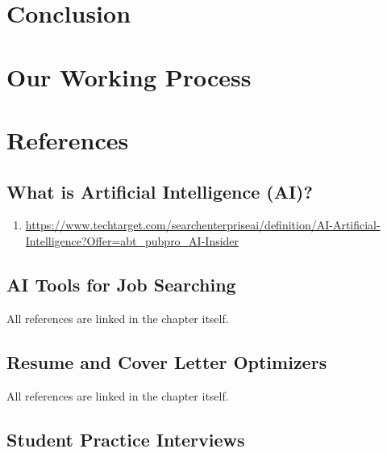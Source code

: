 \documentclass[
]{book}
\providecommand{\tightlist}{%
  \setlength{\itemsep}{0pt}\setlength{\parskip}{0pt}}
\begin{document}
\hypertarget{conclusion}{%
\chapter{Conclusion}\label{conclusion}}

\hypertarget{our-working-process}{%
\chapter{Our Working Process}\label{our-working-process}}

\hypertarget{references}{%
\chapter{References}\label{references}}

\hypertarget{what-is-artificial-intelligence-ai-1}{%
\section{What is Artificial Intelligence (AI)?}\label{what-is-artificial-intelligence-ai-1}}

\begin{enumerate}
\def\labelenumi{(\arabic{enumi})}
\tightlist
\item
  \url{https://www.techtarget.com/searchenterpriseai/definition/AI-Artificial-Intelligence?Offer=abt_pubpro_AI-Insider}
\end{enumerate}

\hypertarget{ai-tools-for-job-searching-1}{%
\section{AI Tools for Job Searching}\label{ai-tools-for-job-searching-1}}

All references are linked in the chapter itself.

\hypertarget{resume-and-cover-letter-optimizers-1}{%
\section{Resume and Cover Letter Optimizers}\label{resume-and-cover-letter-optimizers-1}}

All references are linked in the chapter itself.

\hypertarget{student-practice-interviews-1}{%
\section{Student Practice Interviews}\label{student-practice-interviews-1}}
\end{document}
